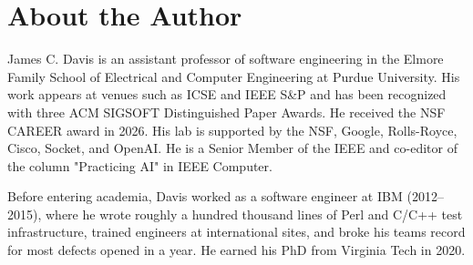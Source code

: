 



\chapter{About the Author}

James C. Davis is an assistant professor of software engineering in the Elmore Family School of Electrical and Computer Engineering at Purdue University. His work appears at venues such as ICSE and IEEE S\&P and has been recognized with three ACM SIGSOFT Distinguished Paper Awards. He received the NSF CAREER award in 2026. His lab is supported by the NSF, Google, Rolls-Royce, Cisco, Socket, and OpenAI. He is a Senior Member of the IEEE and co-editor of the column "Practicing AI" in IEEE Computer.

Before entering academia, Davis worked as a software engineer at IBM (2012--2015), where he wrote roughly a hundred thousand lines of Perl and C/C++ test infrastructure, trained engineers at international sites, and broke his team\textquotesingle s record for most defects opened in a year. He earned his PhD from Virginia Tech in 2020.
